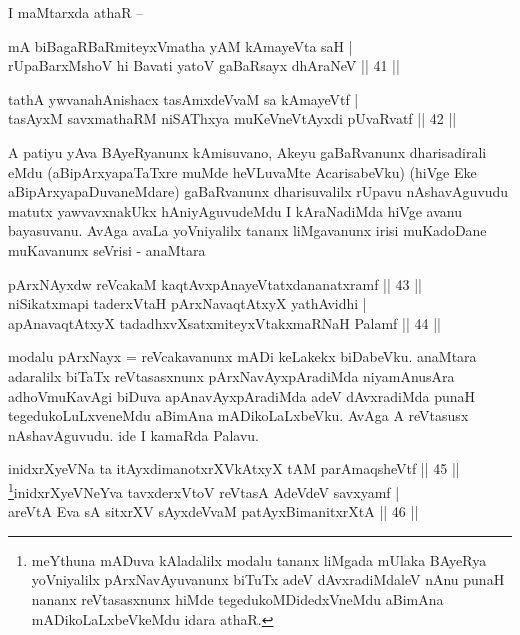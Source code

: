\begin{artha}
I maMtarxda athaR {\rm --}
\end{artha}

\begin{shl}
mA biBagaRBaRmiteyxVmatha yAM kAmayeVta saH | \\
rUpaBarxMshoV hi Bavati yatoV gaBaRsayx dhAraNeV \hfill|| 41 || 
\end{shl}

\begin{shl}
tathA ywvanahAnishacx tasAmxdeVvaM sa kAmayeVtf | \\
tasAyxM savxmathaRM niSAThxya muKeVneVtAyxdi pUvaRvatf \hfill|| 42 || 
\end{shl}

\begin{artha}
A patiyu yAva BAyeRyanunx kAmisuvano, Akeyu gaBaRvanunx dharisadirali 
eMdu (aBipArxyapaTaTxre muMde heVLuvaMte AcarisabeVku) (hiVge Eke 
aBipArxyapaDuvaneMdare) gaBaRvanunx dharisuvalilx rUpavu nAshavAguvudu 
matutx yawvavxnakUkx hAniyAguvudeMdu I kAraNadiMda hiVge avanu 
bayasuvanu. AvAga avaLa yoVniyalilx tananx liMgavanunx irisi 
muKadoDane muKavanunx seVrisi - anaMtara
\end{artha}

\begin{shl}
pArxNAyx\s \s dw reVcakaM kaqtAvx\s pAnayeVtatxdananatxramf \hfill|| 43 || \\
niSikatxmapi taderxVtaH pArxNavaqtAtxyX yathAvidhi | \\
apAnavaqtAtxyX tadadhxvXsatxmiteyxVtakxmaRNaH Palamf \hfill|| 44 || 
\end{shl}

\begin{artha}
modalu pArxNayx = reVcakavanunx mADi keLakekx biDabeVku. anaMtara 
adaralilx biTaTx reVtasasxnunx pArxNavAyxpAradiMda niyamAnusAra 
adhoVmuKavAgi biDuva apAnavAyxpAradiMda adeV dAvxradiMda punaH 
tegedukoLuLxveneMdu aBimAna mADikoLaLxbeVku. AvAga A reVtasusx 
nAshavAguvudu. ide I kamaRda Palavu.
\end{artha}



\begin{shl}
inidxrXyeVNa ta itAyxdimanotxrXVkAtxyX tAM parAmaqsheVtf \hfill|| 45 || \\
\footnote{meYthuna mADuva kAladalilx modalu tananx liMgada mUlaka 
BAyeRya yoVniyalilx pArxNavAyuvanunx biTuTx adeV dAvxradiMdaleV nAnu 
punaH nananx reVtasasxnunx hiMde tegedukoMDidedxVneMdu aBimAna 
mADikoLaLxbeVkeMdu idara athaR.}inidxrXyeVNeYva tavxderxVtoV reVtasA AdeVdeV savxyamf | \\
areVtA Eva sA sitxrXV sAyxdeVvaM patAyx\s BimanitxrXtA \hfill|| 46 || 
\end{shl}

